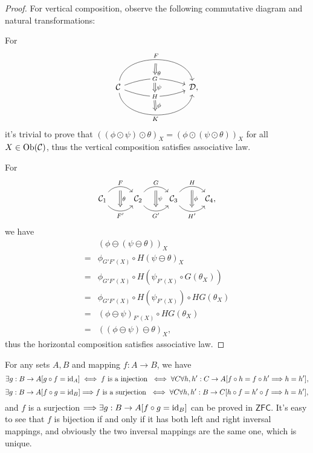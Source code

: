 \documentclass{article}
\begin{document}
\begin{proof}
	For vertical composition, observe the following commutative diagram and natural transformations:

	For
	\[\begin{tikzcd}
		\C
		\arrow[rrr, bend left =80, "F", ""' name=F]
		\arrow[rrr, bend left =20, "G" description, "" name=G, ""' name=GG] 
		\arrow[rrr, bend right=20, "H" description, "" name=H, ""' name=HH]
		\arrow[rrr, bend right=80, "K"', "" name=K] & & &
		\D,
		\arrow[Rightarrow, "\theta", from=F, to=G]
		\arrow[Rightarrow, "\psi" , from=GG, to=H]
		\arrow[Rightarrow, "\phi" , from=HH, to=K]
	\end{tikzcd}\]
	it's trivial to prove that $((\phi\odot\psi)\odot\theta)_X=(\phi\odot(\psi\odot\theta))_X$ for all $X\in \mathrm{Ob}(\mathcal{C})$, thus the vertical composition satisfies associative law.

	For
	\begin{equation}\begin{tikzcd}\label{ass}
		\C_1 \arrow[bend left=50, r, "F", ""' name=F] \arrow[bend right=50, r, "F'"', "" name=F'] &
		\C_2 \arrow[bend left=50, r, "G", ""' name=G] \arrow[bend right=50, r, "G'"', "" name=G'] &	
		\C_3 \arrow[bend left=50, r, "H", ""' name=H] \arrow[bend right=50, r, "H'"', "" name=H'] &
		\arrow[Rightarrow, from=F, to=F', "\theta"]
		\arrow[Rightarrow, from=G, to=G', "\psi"]
		\arrow[Rightarrow, from=H, to=H', "\phi"]
		\C_4,
	\end{tikzcd}\end{equation}
	we have
	\begin{align*}
		 & (\phi\ominus(\psi\ominus\theta))_X\\
		=& \phi_{G'F'(X)}\circ H(\psi\ominus\theta)_X\tag{Def: horizontal composition}\\
		=& \phi_{G'F'(X)}\circ H(\psi_{F'(X)}\circ G(\theta_X))\tag{Ditto}\\
		=& \phi_{G'F'(X)}\circ H(\psi_{F'(X)})\circ HG(\theta_X)\tag{Property of functor $H$}\\
		=& (\phi\ominus\psi)_{F'(X)}\circ HG(\theta_X)\tag{Def: horizontal composition}\\
		=& ((\phi\ominus\psi)\ominus\theta)_X\tag{Ditto},
	\end{align*}
	thus the horizontal composition satisfies associative law.
\end{proof}


\begin{lmm}[$\mathsf{ZF}$]\label{map}
	For any sets $A,B$ and mapping $f:A\to B$, we have
		\[\exists g:B\to A[g\circ f=\mathrm{id}_A]\iff f\ \text{is a injection}\ \iff\forall C\forall h,h':C\to A[f\circ h=f\circ h'\Longrightarrow h=h'],\]
		\[\exists g:B\to A[f\circ g=\mathrm{id}_B]\Longrightarrow f\ \text{is a surjection}\ \iff\forall C\forall h,h':B\to C[h\circ f=h'\circ f\Longrightarrow h=h'],\]
	and $f$ is a surjection $\Longrightarrow \exists g:B\to A[f\circ g=\mathrm{id}_B]$ can be proved in $\mathsf{ZFC}$.
	It's easy to see that $f$ is bijection if and only if it has both left and right inversal mappings, and obviously the two inversal mappings are the same one, which is unique.
\end{lmm}
\end{document}

